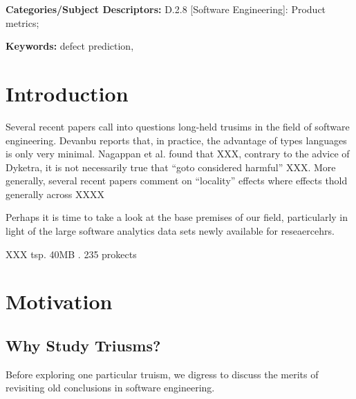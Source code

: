 \documentclass{sig-alternate}
\begin{document}
\vspace{1mm}
\noindent
{\bf Categories/Subject Descriptors:} 
D.2.8 [Software Engineering]: Product metrics; 

 

\vspace{1mm}
\noindent
{\bf Keywords:} defect prediction, 

\section{Introduction}
Several recent papers call into questions long-held trusims in the field
of software engineering. Devanbu reports that, in practice, the advantage of types languages
is only very minimal. Nagappan et al. found that XXX, contrary to the advice of Dyketra,
it is not necessarily true that ``goto considered harmful'' XXX. More generally,
several recent  papers comment on ``locality'' effects where effects
thold  generally across XXXX
 
Perhaps it is time to take a look at the base premises of our field, particularly in light of the large software analytics data sets newly available for reseaercehrs.

XXX tsp. 40MB . 235 prokects

\section{Motivation}
\subsection{Why Study Triusms?}

Before exploring one particular truism, we digress to discuss the merits of revisiting
old conclusions in software engineering.
\end{document}

